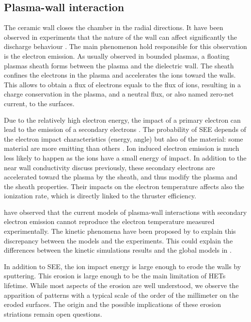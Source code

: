 \subsection*{Plasma-wall interaction}

  The ceramic wall closes the chamber in the radial directions.
  It have been observed in experiments that the nature of the wall can affect significantly the discharge behaviour \citep{gascon2003}.
  The main phenomenon hold responsible for this observation is the electron emission.
  As usually observed in bounded plasmas, a floating plasmas sheath forms between the plasma and the dielectric wall.
  The sheath confines the electrons in the plasma and accelerates the ions toward the walls.
  This allows to obtain a flux of electrons equals to the flux of ions, resulting in a charge conservation in the plasma, and a neutral flux, or also named zero-net current, to the surfaces.
  
  Due to the relatively high electron energy, the impact of a primary electron can lead to the emission of a secondary electrons \citep{barral2003a,villemant2018}.
  The probability of \ac{SEE} depends of the electron impact characteristics (energy, angle) but also of the material\string: some material are more emitting than others \citep{gascon2003}.
  Ion induced electron emission is much less likely to happen as the ions have a small energy of impact.
  In addition to the near wall conductivity discuss previously, these secondary electrons are accelerated toward the plasma by the sheath, and thus modify the plasma and the sheath properties.
  Their impacts on the electron temperature affects also the ionization rate, which is directly linked to the thruster efficiency.
  
  
  \citet{raitses2005} have observed that the current models of plasma-wall interactions with secondary electron emission cannot reproduce the electron temperature measured experimentally.
  The kinetic phenomena have been proposed by \citet{sydorenko2007} to explain this discrepancy between the models and the experiments.
  This could explain the differences between the kinetic simulations results and the global models in \citet{croes2017}.   
    
  \vspace{1em}
  In addition to \ac{SEE}, the ion impact energy is large enough to erode the walls by sputtering.
  This erosion is large enough to be the main limitation of \ac{HET}s lifetime.
  While most aspects of the erosion are well understood, we observe the apparition of  patterns with a typical scale of the order of the millimeter on the eroded surfaces.
  The origin and the possible implications of these erosion striations remain open questions.
  

